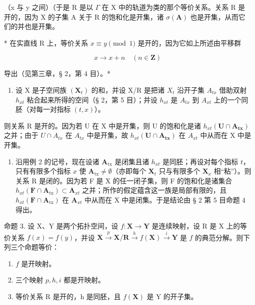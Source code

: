 （x 与 y 之间）（于是 R 是以 \(\Gamma\) 在 X 中的轨道为类的那个等价关系。关系 R 是开的，因为 X 的子集 A 关于 R 的饱和化是开集，诸 \(\sigma(\mathbf{A})\) 也是开集，从而它们的并也是开集。

* 在实直线 R 上，等价关系 \(x \equiv y \pmod{1}\) 是开的，因为它如上所述由平移群

\[
x \rightarrow x + n \quad (n \in \mathbf {Z})
\]

导出（见第三章，§ 2，第 4 目）。*

\begin{enumerate}
\def\labelenumi{\arabic{enumi})}
\setcounter{enumi}{1}
\tightlist
\item
  设 X 是子空间族 \((\mathbf{X}_{t})\) 的和，并设 X/R 是把诸 \(X_{t}\) 沿开子集 \(A_{tx}\) 借助双射 \(h_{xt}\) 粘合起来所得的空间（§ 2，第 5 目）；并设 \(h_{xt}\) 是 \(A_{tx}\) 到 \(A_{xt}\) 上的一个同胚（对每一对指标 \((t, x)\)）。
\end{enumerate}

则关系 R 是开的。因为若 U 在 X 中是开集，则 U 的饱和化是诸 \(h_{xt}(\mathbf{U} \cap \mathbf{A}_{\mathbf{tx}})\) 之并；由于 \(U \cap A_{tx}\) 在 \(A_{tx}\) 中是开集，故 \(h_{xt}(\mathbf{U} \cap \mathbf{A}_{\mathbf{tx}})\) 在 \(A_{xt}\) 中从而在 X 中是开集。

\begin{enumerate}
\def\labelenumi{\arabic{enumi})}
\setcounter{enumi}{2}
\tightlist
\item
  沿用例 2 的记号，现在设诸 \(\mathbf{A}_{\mathrm{tx}}\) 是闭集且诸 \(h_{xt}\) 是同胚；再设对每个指标 \(t\)，只有有限多个指标 \(x\) 使 \(\mathbf{A}_{\mathrm{tx}} \neq \emptyset\)（亦即每个 \(\mathbf{X}_t\) 只与有限多个 \(\mathbf{X}_x\) 相“粘”）。则关系 R 是闭的。因为若 F 是 X 的任一闭子集，则 F 的饱和化是诸集合 \(h_{xt}(\mathbf{F} \cap \mathbf{A}_{\mathrm{tx}}) \subset \mathbf{A}_{xt}\) 之并；所作的假定蕴含这一族是局部有限的，且 \(h_{xt}(\mathbf{F} \cap \mathbf{A}_{\mathrm{tx}})\) 在 \(\mathbf{A}_{xt}\) 中从而在 X 中是闭集。于是结论由 § 2 第 5 目命题 4 得出。
\end{enumerate}

命题 3. 设 X、Y 是两个拓扑空间，设 \(f: \mathbf{X} \to \mathbf{Y}\) 是连续映射，设 R 是 X 上的等价关系 \(f(x) = f(y)\)，并设 \(\mathbf{X} \xrightarrow{p} \mathbf{X}/\mathbf{R} \xrightarrow{h} f(\mathbf{X}) \xrightarrow{i} \mathbf{Y}\) 是 \(f\) 的典范分解。则下列三个命题等价：

\begin{enumerate}
\def\labelenumi{\alph{enumi})}
\item
  \(f\) 是开映射。
\item
  三个映射 \(p, h, i\) 都是开映射。
\item
  等价关系 R 是开的，h 是同胚，且 \(f(\mathbf{X})\) 是 Y 的开子集。
\end{enumerate}

